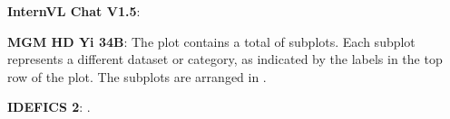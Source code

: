 \begin{wronganswer}
\textbf{InternVL Chat V1.5}: \small{}
\end{wronganswer}

\begin{wronganswer}
\textbf{MGM HD Yi 34B}: \small{The plot contains a total of  subplots. Each subplot represents a different dataset or category, as indicated by the labels in the top row of the plot. The subplots are arranged in .}
\end{wronganswer}

\begin{wronganswer}
\textbf{IDEFICS 2}: \small{.}
\end{wronganswer}